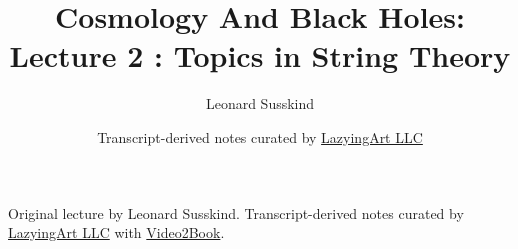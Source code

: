 \documentclass[11pt,oneside]{book}
\begin{document}
\frontmatter
\title{Cosmology And Black Holes: Lecture 2 : Topics in String Theory}
\author{Leonard Susskind}
\date{Transcript-derived notes curated by \href{https://lazying.art}{LazyingArt LLC}}
\maketitle
\begin{center}
\small Original lecture by Leonard Susskind. Transcript-derived notes curated by \href{https://lazying.art}{LazyingArt LLC} with \href{https://github.com/lachlanchen/Video2Book}{Video2Book}.
\end{center}
\clearpage
\mainmatter

\end{document}

